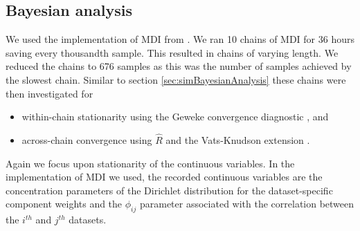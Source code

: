 \documentclass[]{article}
\begin{document}
\subsection{Bayesian analysis} \label{sec:yeastBayesianAnalysis}
We used the implementation of MDI from \cite{mason2016mdi}. We ran 10 chains of MDI for 36 hours saving every thousandth sample. This resulted in chains of varying length. We reduced the chains to 676 samples as this was the number of samples achieved by the slowest chain. Similar to section \ref{sec:simBayesianAnalysis} these chains were then investigated for 
\begin{itemize}
	\item within-chain stationarity using the Geweke convergence diagnostic \citep{geweke1991evaluating}, and
	\item across-chain convergence using $\hat{R}$ \citep{gelman1992inference} and the Vats-Knudson extension \citep[\emph{stable $\hat{R}$},][]{vats2018revisiting}.
\end{itemize}
%
%
Again we focus upon stationarity of the continuous variables. In the implementation of MDI we used, the recorded continuous variables are the concentration parameters of the Dirichlet distribution for the dataset-specific component weights and the $\phi_{ij}$ parameter associated with the correlation between the $i^{th}$ and $j^{th}$ datasets. 
\end{document}
